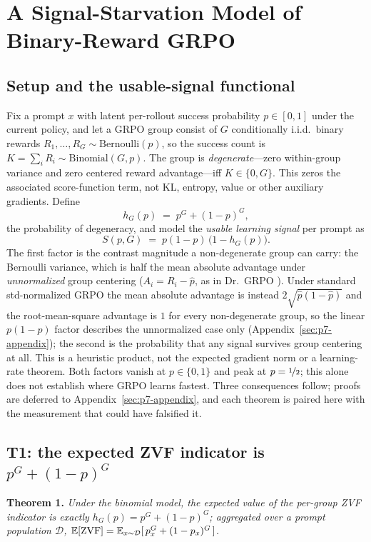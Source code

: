 \section{A Signal-Starvation Model of Binary-Reward GRPO}
\label{sec:p7-theory}

\subsection{Setup and the usable-signal functional}
\label{sec:p7-theory-setup}
Fix a prompt $x$ with latent per-rollout success probability $p \in [0,1]$
under the current policy, and let a GRPO group consist of $G$ conditionally
i.i.d.\ binary rewards $R_1, \dots, R_G \sim \mathrm{Bernoulli}(p)$, so the
success count is $K = \sum_i R_i \sim \mathrm{Binomial}(G, p)$. The group is
\emph{degenerate}---zero within-group variance and zero centered reward
advantage---iff $K \in \{0,G\}$. This zeros the associated score-function
term, not KL, entropy, value or other auxiliary gradients. Define
\begin{equation}
  h_G(p) \;=\; p^G + (1-p)^G,
  \label{eq:p7-hG}
\end{equation}
the probability of degeneracy, and model the \emph{usable learning signal}
per prompt as
\begin{equation}
  S(p, G) \;=\; p(1-p)\,\bigl(1 - h_G(p)\bigr).
  \label{eq:p7-S}
\end{equation}
The first factor is the contrast magnitude a non-degenerate group can carry:
the Bernoulli variance, which is half the mean absolute advantage under
\emph{unnormalized} group centering ($A_i=R_i-\hat p$, as in Dr.~GRPO
\citep{tong2025drgrpo}). Under standard std-normalized GRPO the mean absolute
advantage is instead $2\sqrt{\hat p(1-\hat p)}$ and the root-mean-square
advantage is $1$ for every non-degenerate group, so the linear $p(1-p)$
factor describes the unnormalized case only (Appendix~\ref{sec:p7-appendix}); the second is the probability that any
signal survives group centering at all. This is a heuristic product, not the
expected gradient norm or a learning-rate theorem. Both factors vanish at
$p\in\{0,1\}$ and peak at $p=\nicefrac12$; this alone does not establish
where GRPO learns fastest. Three consequences
follow; proofs are deferred to Appendix~\ref{sec:p7-appendix}, and each
theorem is paired here with the measurement that could have falsified it.

\subsection{T1: the expected ZVF indicator is \texorpdfstring{$p^G + (1-p)^G$}{p\string^G + (1-p)\string^G}}
\label{sec:p7-t1}
\textbf{Theorem 1.} \emph{Under the binomial model, the expected value of the
per-group ZVF indicator is exactly $h_G(p) = p^G + (1-p)^G$; aggregated over
a prompt population $\mathcal{D}$, $\mathbb{E}[\mathrm{ZVF}] =
\mathbb{E}_{x \sim \mathcal{D}}[\,p_x^G + (1-p_x)^G\,]$.}

